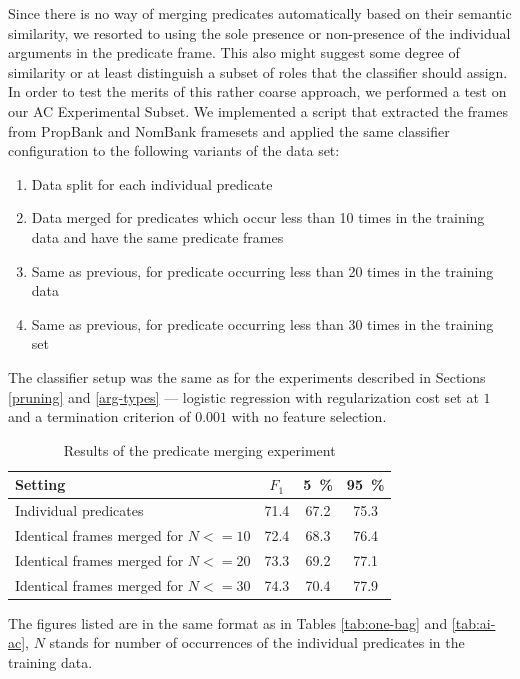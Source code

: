 \documentclass[12pt,notitlepage,a4paper]{report}
\begin{document}
Since there is no way of merging predicates automatically based on their semantic similarity, we resorted to using the sole presence or non-presence of the individual arguments in the predicate frame. This also might suggest some degree of similarity or at least distinguish a subset of roles that the classifier should assign. In order to test the merits of this rather coarse approach, we performed a test on our AC Experimental Subset. We implemented a script that extracted the frames from PropBank and NomBank framesets and applied the same classifier configuration to the following variants of the data set:
\begin{enumerate}
    \item Data split for each individual predicate
    \item Data merged for predicates which occur less than 10 times in the training data and have the same predicate frames
    \item Same as previous, for predicate occurring less than 20 times in the training data
    \item Same as previous, for predicate occurring less than 30 times in the training set
\end{enumerate}
The classifier setup was the same as for the experiments described in Sections \ref{pruning} and \ref{arg-types} --- logistic regression with regularization cost set at $1$ and a termination criterion of $0.001$ with no feature selection.

\begin{table}[htb]\label{tab:merge}
\caption{Results of the predicate merging experiment}\footnotesize
\begin{center}
\begin{tabular}{|l|c|c|c|}\hline
\bf Setting & $F_1$ & \bf 5~\% & \bf 95~\% \\\hline
Individual predicates & 71.4 & 67.2 & 75.3 \\
Identical frames merged for $N <= 10$ & 72.4 & 68.3 & 76.4 \\
Identical frames merged for $N <= 20$ & 73.3 & 69.2 & 77.1 \\
Identical frames merged for $N <= 30$ & 74.3 & 70.4 & 77.9 \\\hline
\end{tabular}
\end{center}
The figures listed are in the same format as in Tables \ref{tab:one-bag} and \ref{tab:ai-ac}, $N$ stands for number of occurrences of the individual predicates in the training data.
\end{table}
\end{document}
